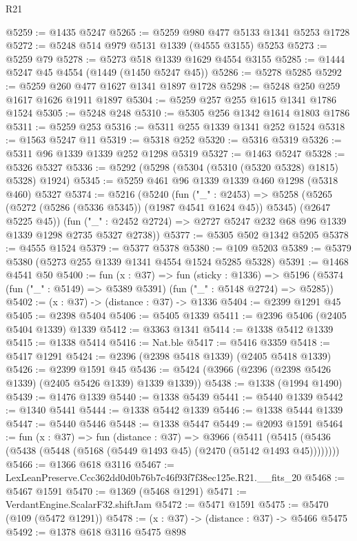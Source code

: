 \begin{lexlean}{R21}
\begin{coremodule}
@5259 := @1435 @5247
@5265 := @5259 @980 @477 @5133 @1341 @5253 @1728
@5272 := @5248 @514 @979 @5131 @1339 (@4555 @3155) @5253
@5273 := @5259 @79
@5278 := @5273 @518 @1339 @1629 @4554 @3155
@5285 := @1444 @5247 @45 @4554 (@1449 (@1450 @5247 @45))
@5286 := @5278 @5285
@5292 := @5259 @260 @477 @1627 @1341 @1897 @1728
@5298 := @5248 @250 @259 @1617 @1626 @1911 @1897
@5304 := @5259 @257 @255 @1615 @1341 @1786 @1524
@5305 := @5248 @248
@5310 := @5305 @256 @1342 @1614 @1803 @1786
@5311 := @5259 @253
@5316 := @5311 @255 @1339 @1341 @252 @1524
@5318 := @1563 @5247 @11
@5319 := @5318 @252
@5320 := @5316 @5319
@5326 := @5311 @96 @1339 @1339 @252 @1298 @5319
@5327 := @1463 @5247
@5328 := @5326 @5327
@5336 := @5292 (@5298 (@5304 (@5310 (@5320 @5328) @1815) @5328) @1924)
@5345 := @5259 @461 @96 @1339 @1339 @460 @1298 (@5318 @460) @5327
@5374 := @5216
    (@5240
      (fun ("_" : @2453) =>
      @5258 (@5265 (@5272 (@5286 (@5336 @5345)) (@1987 @4541 @1624 @45)) @5345) (@2647 @5225 @45))
      (fun ("_" : @2452 @2724) => @2727 @5247 @232 @68 @96 @1339 @1339 @1298 @2735 @5327 @2738))
@5377 := @5305 @502 @1342 @5205
@5378 := @4555 @1524
@5379 := @5377 @5378
@5380 := @109 @5203
@5389 := @5379 @5380 (@5273 @255 @1339 @1341 @4554 @1524 @5285 @5328)
@5391 := @1468 @4541 @50
@5400 := fun (x : @37) =>
  fun (sticky : @1336) =>
  @5196 (@5374 (fun ("_" : @5149) => @5389 @5391) (fun ("_" : @5148 @2724) => @5285))
@5402 := (x : @37) -> (distance : @37) -> @1336
@5404 := @2399 @1291 @45
@5405 := @2398 @5404
@5406 := @5405 @1339
@5411 := @2396 @5406 (@2405 @5404 @1339) @1339
@5412 := @3363 @1341
@5414 := @1338 @5412 @1339
@5415 := @1338 @5414
@5416 := Nat.ble
@5417 := @5416 @3359
@5418 := @5417 @1291
@5424 := @2396 (@2398 @5418 @1339) (@2405 @5418 @1339)
@5426 := @2399 @1591 @45
@5436 := @5424 (@3966 (@2396 (@2398 @5426 @1339) (@2405 @5426 @1339) @1339 @1339))
@5438 := @1338 (@1994 @1490)
@5439 := @1476 @1339
@5440 := @1338 @5439
@5441 := @5440 @1339
@5442 := @1340 @5441
@5444 := @1338 @5442 @1339
@5446 := @1338 @5444 @1339
@5447 := @5440 @5446
@5448 := @1338 @5447
@5449 := @2093 @1591
@5464 := fun (x : @37) =>
  fun (distance : @37) =>
  @3966 (@5411 (@5415 (@5436 (@5438 (@5448 (@5168 (@5449 @1493 @45) (@2470 (@5142 @1493 @45))))))))
@5466 := @1366 @618 @3116
@5467 := LexLeanPreserve.Ccc362dd0d0b76b7c46f93f7f38ec125e.R21.__fits_20
@5468 := @5467 @1591
@5470 := @1369 (@5468 @1291)
@5471 := VerdantEngine.ScalarF32.shiftJam
@5472 := @5471 @1591
@5475 := @5470 (@109 (@5472 @1291))
@5478 := (x : @37) -> (distance : @37) -> @5466 @5475
@5492 := @1378
    @618
    @3116
    @5475
    @898

\end{coremodule}
\end{lexlean}
